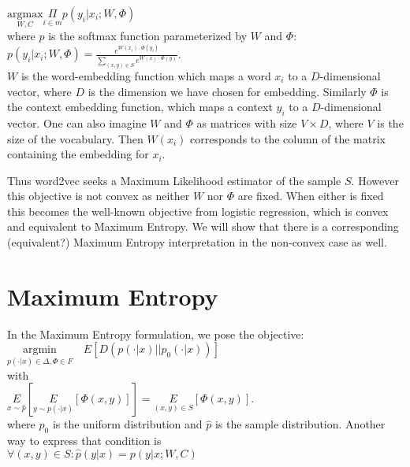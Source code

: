 \documentclass[]{article}
\begin{document}
$\underset{W,C}{\text{argmax}} \underset{i \in m}{\Pi}{p(y_i|x_i; W, \Phi)}$\\

\noindent where $p$ is the softmax function parameterized by $W$ and $\Phi$:\\

$p(y_i|x_i; W,\Phi) = \frac{e^{W(x_i) \cdot \Phi(y_i)}}{\sum_{(x,y) \in S}e^{W(x) \cdot \Phi(y)}}$.\\

$W$ is the word-embedding function which maps a word $x_i$ to a $D$-dimensional vector, where $D$ is the dimension we have chosen for embedding. Similarly $\Phi$ is the context embedding function, which maps a context $y_i$ to a $D$-dimensional vector. One can also imagine $W$ and $\Phi$ as matrices with size $V \times D$, where $V$ is the size of the vocabulary. Then $W(x_i)$ corresponds to the column of the matrix containing the embedding for $x_i$.

Thus word2vec seeks a Maximum Likelihood estimator of the sample $S$. However this objective is not convex as neither $W$ nor $\Phi$ are fixed. When either is fixed this becomes the well-known objective from logistic regression, which is convex and equivalent to Maximum Entropy\cite{dummy}. We will show that there is a corresponding (equivalent?) Maximum Entropy interpretation in the non-convex case as well.

\section{Maximum Entropy}

In the Maximum Entropy formulation, we pose the objective:\\

$\underset{p(\cdot | x) \in \Delta, \Phi \in F}{\text{argmin}} \quad E \left[D(p(\cdot|x) \vert \vert  p_0(\cdot|x))\right]$\\

\noindent with\\

$\underset{x \sim \hat{p}}{E}\left[\underset{y \sim p(\cdot|x)}{E}\left[\Phi(x,y)\right]\right] = \underset{(x,y) \in S}{E}\left[\Phi(x,y)\right]$.\\

\noindent where $p_0$ is the uniform distribution and $\hat{p}$ is the sample distribution. Another way to express that condition is\\

$\forall (x,y) \in S: \hat{p}(y|x) = p(y|x; W,C)$\\
\end{document}
